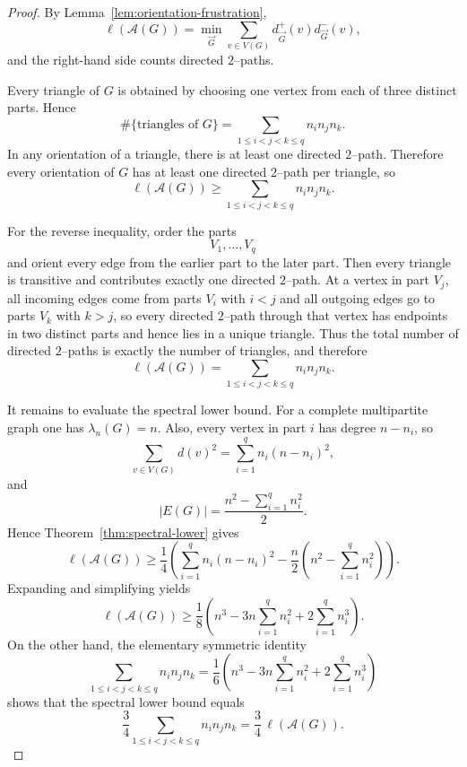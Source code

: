 \documentclass[10pt,a4paper]{amsart}
\begin{document}
\begin{proof}
By Lemma~\ref{lem:orientation-frustration},
\[
\ell(\mathcal A(G))
=
\min_{\vec G}\sum_{v\in V(G)} d^+_{\vec G}(v)d^-_{\vec G}(v),
\]
and the right-hand side counts directed $2$--paths.

Every triangle of $G$ is obtained by choosing one vertex from each of three
distinct parts. Hence
\[
\#\{\text{triangles of }G\}
=
\sum_{1\le i<j<k\le q} n_i n_j n_k.
\]
In any orientation of a triangle, there is at least one directed $2$--path.
Therefore every orientation of $G$ has at least one directed $2$--path per
triangle, so
\[
\ell(\mathcal A(G))
\ge
\sum_{1\le i<j<k\le q} n_i n_j n_k.
\]

For the reverse inequality, order the parts
\[
V_1,\dots,V_q
\]
and orient every edge from the earlier part to the later part.
Then every triangle is transitive and contributes exactly one directed
$2$--path.
At a vertex in part $V_j$, all incoming edges come from parts $V_i$ with $i<j$
and all outgoing edges go to parts $V_k$ with $k>j$, so every directed
$2$--path through that vertex has endpoints in two distinct parts and hence lies
in a unique triangle.
Thus the total number of directed $2$--paths is exactly the number of triangles,
and therefore
\[
\ell(\mathcal A(G))
=
\sum_{1\le i<j<k\le q} n_i n_j n_k.
\]

It remains to evaluate the spectral lower bound.
For a complete multipartite graph one has $\lambda_n(G)=n$.
Also, every vertex in part $i$ has degree $n-n_i$, so
\[
\sum_{v\in V(G)} d(v)^2=\sum_{i=1}^q n_i(n-n_i)^2,
\]
and
\[
|E(G)|=\frac{n^2-\sum_{i=1}^q n_i^2}{2}.
\]
Hence Theorem~\ref{thm:spectral-lower} gives
\[
\ell(\mathcal A(G))
\ge
\frac{1}{4}\left(\sum_{i=1}^q n_i(n-n_i)^2
-\frac{n}{2}\left(n^2-\sum_{i=1}^q n_i^2\right)\right).
\]
Expanding and simplifying yields
\[
\ell(\mathcal A(G))
\ge
\frac18\left(n^3-3n\sum_{i=1}^q n_i^2+2\sum_{i=1}^q n_i^3\right).
\]
On the other hand, the elementary symmetric identity
\[
\sum_{1\le i<j<k\le q} n_i n_j n_k
=
\frac16\left(n^3-3n\sum_{i=1}^q n_i^2+2\sum_{i=1}^q n_i^3\right)
\]
shows that the spectral lower bound equals
\[
\frac34\sum_{1\le i<j<k\le q} n_i n_j n_k
=
\frac34\,\ell(\mathcal A(G)).
\]
\end{proof}
\end{document}
